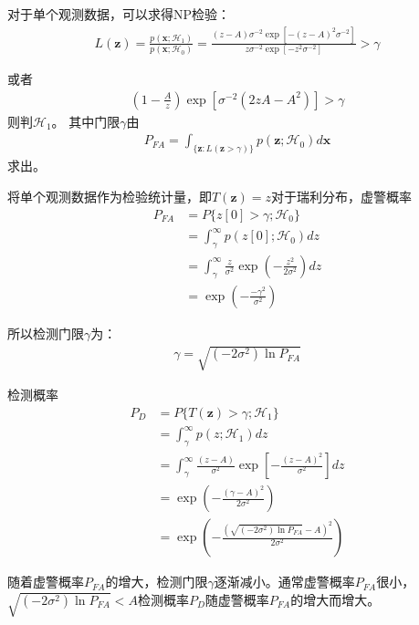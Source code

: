 \documentclass[fontset=windows]{article}
\numberwithin{figure}{section}
\begin{document}
对于单个观测数据，可以求得NP检验：
\begin{align*}
	L(\mathbf{\mathbf{z}})=\frac{p(\mathbf{x};\mathcal{H}_1)}{p(\mathbf{x};\mathcal{H}_0)}
	=\frac{(z-A)\sigma^{-2}\exp\left[-(z-A)^2\sigma^{-2}\right]}
	{z\sigma^{-2}\exp\left[-z^2\sigma^{-2}\right]}>\gamma
\end{align*}

或者
\begin{align*}
	(1-\frac{A}{z})\exp[\sigma^{-2}(2zA-A^2)]>\gamma
\end{align*}
则判\(\mathcal{H}_1\)。
其中门限\(\gamma\)由
\begin{align*}
	P_{FA}=\int_{\{\mathbf{z}:L(\mathbf{z}>\gamma)\}}p(\mathbf{z};\mathcal{H}_0)d\mathbf{x}
\end{align*}
求出。

将单个观测数据作为检验统计量，即\(T(\mathbf{z})=z\)对于瑞利分布，虚警概率
\begin{align*}
	P_{FA} & =P\{z[0]>\gamma;\mathcal{H}_0\}                                                     \\
	       & =\int_{\gamma}^{\infty}p(z[0];\mathcal{H}_0)dz                                      \\
	       & =\int_{\gamma}^{\infty}\frac{z}{\sigma^2}\exp \left(-\frac{z^2}{2\sigma^2}\right)dz \\
	       & =\exp\left(-\frac{-\gamma^2}{\sigma^2}\right)
\end{align*}

所以检测门限\(\gamma\)为：
\begin{align*}
	\gamma=\sqrt{(-2\sigma^2)\ln P_{FA}}
\end{align*}

检测概率
\begin{align*}
	P_D & =P\{T(\mathbf{z})>\gamma;\mathcal{H}_1\}                                                  \\
	    & =\int_{\gamma}^{\infty}p(z;\mathcal{H}_1)dz                                               \\
	    & =\int_{\gamma}^{\infty}\frac{(z-A)}{\sigma^2}\exp\left[-\frac{(z-A)^2}{\sigma^2}\right]dz \\
	    & =\exp\left(-\frac{(\gamma-A)^2}{2\sigma^2}\right)                                         \\
	    & =\exp\left(-\frac{(\sqrt{(-2\sigma^2)\ln P_{FA}}-A)^2}{2\sigma^2}\right)
\end{align*}

随着虚警概率\(P_{FA}\)的增大，检测门限\(\gamma\)逐渐减小。通常虚警概率\(P_{FA}\)很小，\(\sqrt{(-2\sigma^2)\ln P_{FA}}<A\)检测概率\(P_D\)随虚警概率\(P_{FA}\)的增大而增大。
\end{document}
